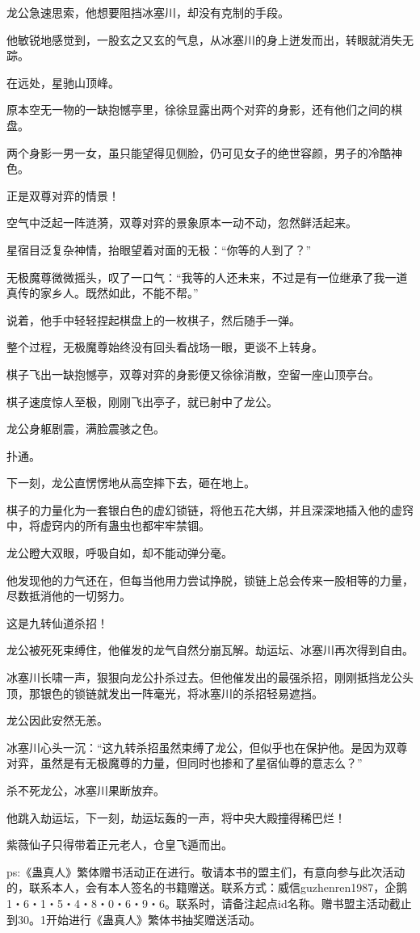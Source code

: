 \begin{this_body}
龙公急速思索，他想要阻挡冰塞川，却没有克制的手段。

他敏锐地感觉到，一股玄之又玄的气息，从冰塞川的身上迸发而出，转眼就消失无踪。

在远处，星驰山顶峰。

原本空无一物的一缺抱憾亭里，徐徐显露出两个对弈的身影，还有他们之间的棋盘。

两个身影一男一女，虽只能望得见侧脸，仍可见女子的绝世容颜，男子的冷酷神色。

正是双尊对弈的情景！

空气中泛起一阵涟漪，双尊对弈的景象原本一动不动，忽然鲜活起来。

星宿目泛复杂神情，抬眼望着对面的无极：“你等的人到了？”

无极魔尊微微摇头，叹了一口气：“我等的人还未来，不过是有一位继承了我一道真传的家乡人。既然如此，不能不帮。”

说着，他手中轻轻捏起棋盘上的一枚棋子，然后随手一弹。

整个过程，无极魔尊始终没有回头看战场一眼，更谈不上转身。

棋子飞出一缺抱憾亭，双尊对弈的身影便又徐徐消散，空留一座山顶亭台。

棋子速度惊人至极，刚刚飞出亭子，就已射中了龙公。

龙公身躯剧震，满脸震骇之色。

扑通。

下一刻，龙公直愣愣地从高空摔下去，砸在地上。

棋子的力量化为一套银白色的虚幻锁链，将他五花大绑，并且深深地插入他的虚窍中，将虚窍内的所有蛊虫也都牢牢禁锢。

龙公瞪大双眼，呼吸自如，却不能动弹分毫。

他发现他的力气还在，但每当他用力尝试挣脱，锁链上总会传来一股相等的力量，尽数抵消他的一切努力。

这是九转仙道杀招！

龙公被死死束缚住，他催发的龙气自然分崩瓦解。劫运坛、冰塞川再次得到自由。

冰塞川长啸一声，狠狠向龙公扑杀过去。但他催发出的最强杀招，刚刚抵挡龙公头顶，那银色的锁链就发出一阵毫光，将冰塞川的杀招轻易遮挡。

龙公因此安然无恙。

冰塞川心头一沉：“这九转杀招虽然束缚了龙公，但似乎也在保护他。是因为双尊对弈，虽然是有无极魔尊的力量，但同时也掺和了星宿仙尊的意志么？”

杀不死龙公，冰塞川果断放弃。

他跳入劫运坛，下一刻，劫运坛轰的一声，将中央大殿撞得稀巴烂！

紫薇仙子只得带着正元老人，仓皇飞遁而出。

ps:《蛊真人》繁体赠书活动正在进行。敬请本书的盟主们，有意向参与此次活动的，联系本人，会有本人签名的书籍赠送。联系方式：威信guzhenren1987，企鹅1・6・1・5・4・8・0・6・9・6。联系时，请备注起点id名称。赠书盟主活动截止到30。1开始进行《蛊真人》繁体书抽奖赠送活动。

\end{this_body}


